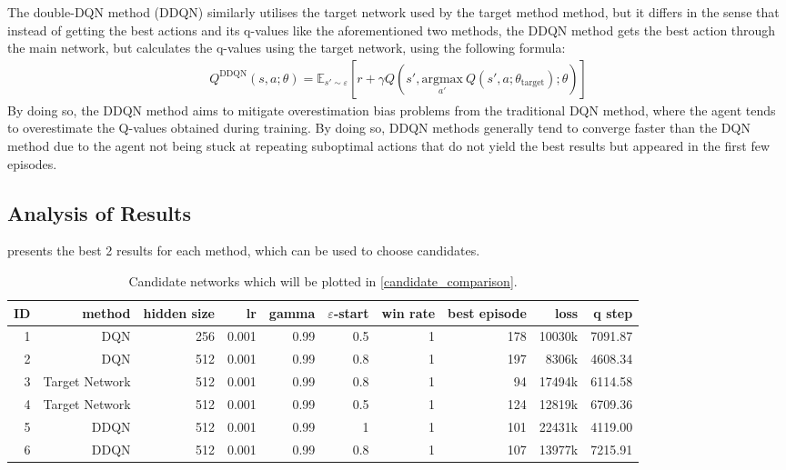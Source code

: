 The double-DQN method (DDQN) similarly utilises the target network used by the target method method, but it differs in the sense that instead of getting the best actions and its q-values like the aforementioned two methods, the DDQN method gets the best action through the main network, but calculates the q-values using the target network, using the following formula:
\begin{align*}
    Q^{\text{DDQN}}(s, a ; \theta) = \mathbb{E}_{s' \sim \varepsilon}[r + \gamma Q(s', \underset{a'}{\text{argmax}}\ Q(s', a ; \theta_{\text{target}}) ; \theta)]
\end{align*}
By doing so, the DDQN method aims to mitigate overestimation bias problems from the traditional DQN method, where the agent tends to overestimate the Q-values obtained during training. By doing so, DDQN methods generally tend to converge faster than the DQN method due to the agent not being stuck at repeating suboptimal actions that do not yield the best results but appeared in the first few episodes.

\subsection{Analysis of Results}

 presents the best 2 results for each method, which can be used to choose candidates.
\begin{table}[h]
	\centering
	\scriptsize
	\begin{tabular}{r r r r r r | r r r r}
		\toprule
		ID & method & hidden size & lr & gamma & $\varepsilon$-start & win rate & best episode & loss & q step \\
  \midrule
		1 & DQN & 256 & 0.001 & 0.99 & 0.5 & 1 & 178 & 10030k & 7091.87 \\
		2 & DQN & 512 & 0.001 & 0.99 & 0.8 & 1 & 197 & 8306k & 4608.34 \\
		3 & Target Network & 512 & 0.001 & 0.99 & 0.8 & 1 & 94 & 17494k & 6114.58 \\
		4 & Target Network & 512 & 0.001 & 0.99 & 0.5 & 1 & 124 & 12819k & 6709.36 \\
		5 & DDQN & 512 & 0.001 & 0.99 & 1 & 1 & 101 & 22431k & 4119.00 \\
		6 & DDQN & 512 & 0.001 & 0.99 & 0.8 & 1 & 107 & 13977k & 7215.91 \\
  \bottomrule
  \end{tabular}
	\caption{Candidate networks which will be plotted in \cref{candidate_comparison}.}
	\label{best_results_t2}
\end{table}


